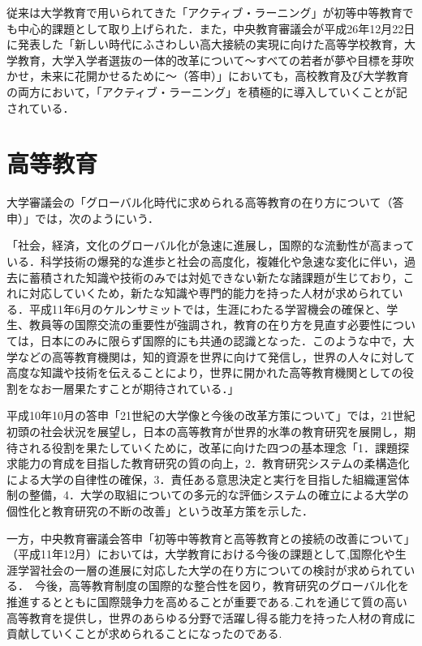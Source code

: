 従来は大学教育で用いられてきた「アクティブ・ラーニング」が初等中等教育でも中心的課題として取り上げられた．また，中央教育審議会が平成26年12月22日に発表した「新しい時代にふさわしい高大接続の実現に向けた高等学校教育，大学教育，大学入学者選抜の一体的改革について〜すべての若者が夢や目標を芽吹かせ，未来に花開かせるために〜（答申）」においても，高校教育及び大学教育の両方において，「アクティブ・ラーニング」を積極的に導入していくことが記されている．

\newpage

\section{高等教育}

大学審議会の「グローバル化時代に求められる高等教育の在り方について（答申）」では，次のようにいう\cite{グローバル化時代に求められる高等教育の在り方について}．

「社会，経済，文化のグローバル化が急速に進展し，国際的な流動性が高まっている．科学技術の爆発的な進歩と社会の高度化，複雑化や急速な変化に伴い，過去に蓄積された知識や技術のみでは対処できない新たな諸課題が生じており，これに対応していくため，新たな知識や専門的能力を持った人材が求められている．平成11年6月のケルンサミットでは，生涯にわたる学習機会の確保と、学生、教員等の国際交流の重要性が強調され，教育の在り方を見直す必要性については，日本にのみに限らず国際的にも共通の認識となった．このような中で，大学などの高等教育機関は，知的資源を世界に向けて発信し，世界の人々に対して高度な知識や技術を伝えることにより，世界に開かれた高等教育機関としての役割をなお一層果たすことが期待されている．」

平成10年10月の答申「21世紀の大学像と今後の改革方策について」では，21世紀初頭の社会状況を展望し，日本の高等教育が世界的水準の教育研究を展開し，期待される役割を果たしていくために，改革に向けた四つの基本理念「1．課題探求能力の育成を目指した教育研究の質の向上，2．教育研究システムの柔構造化による大学の自律性の確保，3．責任ある意思決定と実行を目指した組織運営体制の整備，4．大学の取組についての多元的な評価システムの確立による大学の個性化と教育研究の不断の改善」という改革方策を示した．

一方，中央教育審議会答申「初等中等教育と高等教育との接続の改善について」（平成11年12月）においては，大学教育における今後の課題として,国際化や生涯学習社会の一層の進展に対応した大学の在り方についての検討が求められている．　今後，高等教育制度の国際的な整合性を図り，教育研究のグローバル化を推進するとともに国際競争力を高めることが重要である.これを通じて質の高い高等教育を提供し，世界のあらゆる分野で活躍し得る能力を持った人材の育成に貢献していくことが求められることになったのである.


